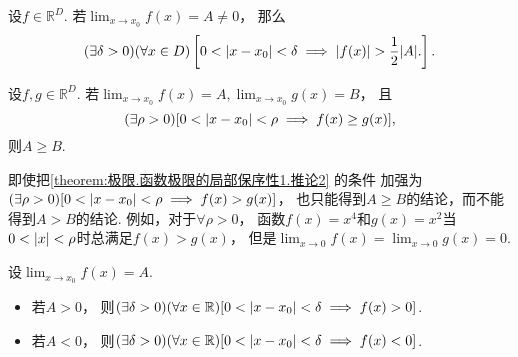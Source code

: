 \begin{corollary}\label{theorem:极限.函数极限的局部保序性1.推论1}
设\(f\in\mathbb{R}^D\).
若\(\lim_{x\to x_0} f(x) = A \neq 0\)，
那么\[
	(\exists \delta>0)
	(\forall x\in D)
	\left[
		0<\abs{x-x_0}<\delta
		\implies
		\abs{f(x)}>\frac12\abs{A}.
	\right].
\]
\end{corollary}

\begin{corollary}\label{theorem:极限.函数极限的局部保序性1.推论2}
设\(f,g\in\mathbb{R}^D\).
若\(\lim_{x\to x_0} f(x) = A,
\lim_{x\to x_0} g(x) = B\)，
且\[
	(\exists\rho>0)[0<\abs{x-x_0}<\rho \implies f(x) \geq g(x)],
\]
则\(A \geq B\).
\end{corollary}
\begin{remark}
即使把\cref{theorem:极限.函数极限的局部保序性1.推论2} 的条件
加强为\((\exists\rho>0)[0<\abs{x-x_0}<\rho \implies f(x) > g(x)]\)，
也只能得到\(A \geq B\)的结论，而不能得到\(A > B\)的结论.
例如，对于\(\forall\rho>0\)，
函数\(f(x) = x^4\)和\(g(x) = x^2\)当\(0<\abs{x}<\rho\)时总满足\(f(x) > g(x)\)，
但是\(\lim_{x\to0} f(x) = \lim_{x\to0} g(x) = 0\).
\end{remark}


\begin{corollary}[局部保号性]\label{theorem:极限.函数极限的局部保号性1}
设\(\lim_{x \to x_0} f(x) = A\).
\begin{itemize}
	\item 若\(A>0\)，
	则\((\exists\delta>0)
	(\forall x\in\mathbb{R})
	[0<\abs{x-x_0}<\delta \implies f(x)>0]\).
	\item 若\(A<0\)，
	则\((\exists\delta>0)
	(\forall x\in\mathbb{R})
	[0<\abs{x-x_0}<\delta \implies f(x)<0]\).
\end{itemize}
\end{corollary}

